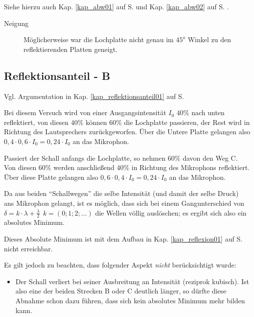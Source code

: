 Siehe hierzu auch Kap. \ref{kap_abw01} auf S. \pageref{kap_abw01} und Kap. \ref{kap_abw02} auf S. \pageref{kap_abw02}.


\begin{description}
   \item[Neigung] Möglicherweise war die Lochplatte nicht genau im \(45^o\) Winkel zu den reflektierenden Platten geneigt.
 \end{description}




\subsection{Reflektionsanteil - B}

Vgl. Argumentation in Kap. \ref{kap_reflektionsanteil01} auf S. \pageref{kap_reflektionsanteil01}


Bei diesem Versuch wird von einer Ausgangsintensität \(I_0\) \(40\%\) nach unten reflektiert, von diesen \(40\%\) können \(60\%\) die Lochplatte passieren, der Rest wird in Richtung des Lautsprechers zurückgeworfen. Über die Untere Platte gelangen also \(0,4 \cdot 0,6 \cdot I_0 = 0,24 \cdot I_0\) an das Mikrophon.

Passiert der Schall anfangs die Lochplatte, so nehmen \(60\%\) davon den Weg C. Von diesen \(60\%\) werden anschließend \(40\%\) in Richtung des Mikrophons reflektiert. Über diese Platte gelangen also \(0,6 \cdot 0,4 \cdot I_0 = 0,24 \cdot I_0\) an das Mikrophon.

Da aus beiden ``Schallwegen'' die selbe Intensität (und damit der selbe Druck) ans Mikrophon gelangt, ist es möglich, dass sich bei einem Gangunterschied von \(\delta = k \cdot \lambda + \frac{\lambda}{2} ~~ k = (0; 1; 2; ...)\) die Wellen völlig auslöschen; es ergibt sich also ein absolutes Minimum.


Dieses Absolute Minimum ist mit dem Aufbau in Kap. \ref{kap_reflexion01} auf S. \pageref{kap_reflexion01} nicht erreichbar.


Es gilt jedoch zu beachten, dass folgender Aspekt \emph{nicht} berücksichtigt wurde:
\begin{itemize}
   \item Der Schall verliert bei seiner Ausbreitung an Intensität (reziprok kubisch). Ist also eine der beiden Strecken B oder C deutlich länger, so dürfte diese Abnahme schon dazu führen, dass sich kein absolutes Minimum mehr bilden kann.
\end{itemize}




